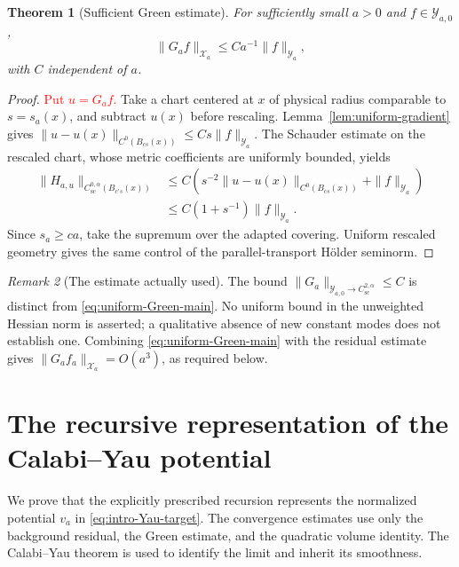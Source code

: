 \documentclass[11pt,a4paper,twoside]{article}
\numberwithin{equation}{section}
\newtheorem{theorem}{Theorem}[section]
\theoremstyle{definition}
\theoremstyle{remark}
\newtheorem{remark}[theorem]{Remark}
\begin{document}
\begin{theorem}[Sufficient Green estimate]\label{thm:uniform-green}
For sufficiently small \(a>0\) and \(f\in\mathcal Y_{a,0}\),
\begin{equation}\label{eq:uniform-Green-main}
\|G_af\|_{\mathcal X_a}\le Ca^{-1}\|f\|_{\mathcal Y_a},
\end{equation}
with \(C\) independent of \(a\).
\end{theorem}
\begin{proof}
\textcolor{red}{Put \(u=G_af\).} Take a chart centered at \(x\) of physical radius comparable to
\(s=s_a(x)\), and subtract \(u(x)\) before rescaling.
Lemma~\ref{lem:uniform-gradient} gives
\(\|u-u(x)\|_{C^0(B_{cs}(x))}\le Cs\|f\|_{\mathcal Y_a}\).
The Schauder estimate on the rescaled chart, whose metric
coefficients are uniformly bounded, yields
\[
\begin{aligned}
\|H_{a,u}\|_{C^{0,\alpha}_{\mathrm{sc}}(B_{c's}(x))}
&\le C\left(s^{-2}\|u-u(x)\|_{C^0(B_{cs}(x))}
+\|f\|_{\mathcal Y_a}\right)\\
&\le C(1+s^{-1})\|f\|_{\mathcal Y_a}.
\end{aligned}
\]
Since \(s_a\ge ca\), take the supremum over the adapted covering.
Uniform rescaled geometry gives the same control of the
parallel-transport H\"older seminorm.
\end{proof}
\begin{remark}[The estimate actually used]\label{rem:uniform-Green-consequences}
The bound
\(\|G_a\|_{\mathcal Y_{a,0}\to C_{\mathrm{sc}}^{2,\alpha}}\le C\)
is distinct from \eqref{eq:uniform-Green-main}. No uniform bound in
the unweighted Hessian norm is asserted; a qualitative absence of
new constant modes does not establish one. Combining
\eqref{eq:uniform-Green-main} with the residual estimate gives
\(\|G_af_a\|_{\mathcal X_a}=O(a^3)\), as required below.
\end{remark}
\section{The recursive representation of the Calabi--Yau potential}
\label{sec:nonlinear-correction}
We prove that the explicitly prescribed recursion represents the
normalized potential \(v_a\) in \eqref{eq:intro-Yau-target}.
The convergence estimates use only the background residual, the
Green estimate, and the quadratic volume identity. The Calabi--Yau
theorem is used to identify the limit and inherit its smoothness.
\end{document}
